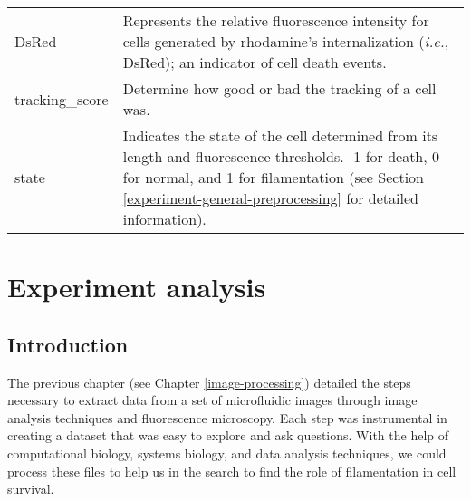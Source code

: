 \documentclass[
  12pt,
  a4paper,
  oneside]{krantz}
\begin{document}
\begin{longtable}[]{@{}ll@{}}
\begin{minipage}[t]{0.33\columnwidth}\raggedright
DsRed\strut
\end{minipage} & \begin{minipage}[t]{0.61\columnwidth}\raggedright
Represents the relative fluorescence intensity for cells
generated by rhodamine's internalization (\emph{i.e.}, DsRed); an
indicator of cell death events.\strut
\end{minipage}\tabularnewline
\begin{minipage}[t]{0.33\columnwidth}\raggedright
tracking\_score\strut
\end{minipage} & \begin{minipage}[t]{0.61\columnwidth}\raggedright
Determine how good or bad the tracking of a cell was.\strut
\end{minipage}\tabularnewline
\begin{minipage}[t]{0.33\columnwidth}\raggedright
state\strut
\end{minipage} & \begin{minipage}[t]{0.61\columnwidth}\raggedright
Indicates the state of the cell determined from its length and
fluorescence thresholds. -1 for death, 0 for normal, and 1 for
filamentation (see Section
\ref{experiment-general-preprocessing} for detailed
information).\strut
\end{minipage}\tabularnewline
\bottomrule
\end{longtable}

\hypertarget{experiment-analysis}{%
\chapter{Experiment analysis}\label{experiment-analysis}}

\hypertarget{introduction-2}{%
\section{Introduction}\label{introduction-2}}

The previous chapter (see Chapter \ref{image-processing}) detailed the
steps necessary to extract data from a set of microfluidic images
through image analysis techniques and fluorescence microscopy. Each step
was instrumental in creating a dataset that was easy to explore and ask
questions. With the help of computational biology, systems biology, and
data analysis techniques, we could process these files to help us in the
search to find the role of filamentation in cell survival.
\end{document}
